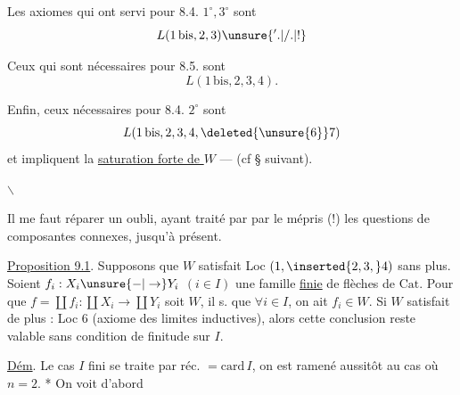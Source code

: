 
Les axiomes qui ont servi pour 8.4. $1^\circ,3^\circ$  sont
\[
 L(1\,\mathrm{bis},2,3)\unsure{'.|/.|!}
\]

Ceux qui sont nécessaires pour 8.5.    sont 
\[
 L(1\,\mathrm{bis},2,3,4).
\]

Enfin, ceux nécessaires pour 8.4. $2^\circ$ sont
\[
 L(1\,\mathrm{bis},2,3,4,\deleted{\unsure{6}}7)
\]
et  impliquent la \uline{saturation forte de $W$} --- (cf \S{} suivant).

$\backslash$

Il me faut réparer un oubli, ayant traité  par par le mépris (!) les questions de composantes connexes, jusqu'à présent.

\uline{Proposition 9.1}. Supposons que $W$ satisfait Loc $(1,\inserted{2,3,}4)$ sans plus.  Soient $f_i:X_i\unsure{-|\to}Y_i$ $(i\in I)$ une famille \uline{finie} de flèches de $\mathrm{Cat}$. Pour que $f=\coprod f_i:\coprod X_i\to\coprod Y_i$ soit  $W$, il  s. que $\forall i\in I$, on ait $f_i\in W$. Si $W$ satisfait de plus : Loc 6 (axiome des limites inductives), alors cette conclusion reste valable sans condition de finitude sur $I$.

\uline{Dém}. Le cas $I$ fini se traite par réc. $=\mathrm{card}\,I$, on est ramené aussitôt au cas où $n=2$. * On voit d'abord 

